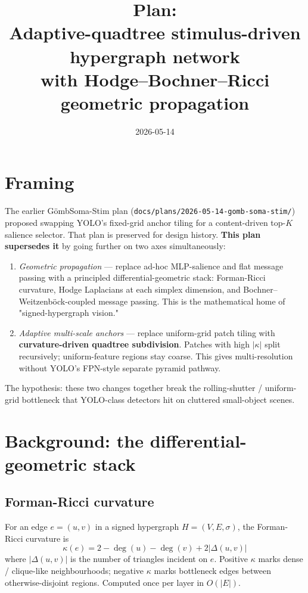 \documentclass[11pt,a4paper]{article}
\title{Plan: \RicciStim{} \\
       \large{Adaptive-quadtree stimulus-driven hypergraph network\\
              with Hodge--Bochner--Ricci geometric propagation}}
\date{2026-05-14}
\author{}
\newcommand{\sig}{\ensuremath{\sigma}}
\newcommand{\Soma}{G\"ombSoma}
\begin{document}
\maketitle

\section{Framing}

The earlier \Soma-Stim plan (\texttt{docs/plans/2026-05-14-gomb-soma-stim/})
proposed swapping YOLO's fixed-grid anchor tiling for a content-driven
top-$K$ salience selector. That plan is preserved for design history.
\textbf{This plan supersedes it} by going further on two axes simultaneously:

\begin{enumerate}
\item \emph{Geometric propagation} --- replace ad-hoc MLP-salience and
  flat message passing with a principled differential-geometric stack:
  Forman-Ricci curvature, Hodge Laplacians at each simplex dimension,
  and Bochner--Weitzenböck-coupled message passing. This is the
  mathematical home of "signed-hypergraph vision."
\item \emph{Adaptive multi-scale anchors} --- replace uniform-grid
  patch tiling with \textbf{curvature-driven quadtree subdivision}.
  Patches with high $|\kappa|$ split recursively; uniform-feature
  regions stay coarse. This gives multi-resolution without YOLO's
  FPN-style separate pyramid pathway.
\end{enumerate}

The hypothesis: these two changes together break the rolling-shutter /
uniform-grid bottleneck that YOLO-class detectors hit on cluttered
small-object scenes.

\section{Background: the differential-geometric stack}

\subsection{Forman-Ricci curvature}

For an edge $e = (u, v)$ in a signed hypergraph $H = (V, E, \sig)$,
the Forman-Ricci curvature is
\[
\kappa(e) = 2 - \deg(u) - \deg(v) + 2 |\Delta(u, v)|
\]
where $|\Delta(u, v)|$ is the number of triangles incident on $e$.
Positive $\kappa$ marks dense / clique-like neighbourhoods;
negative $\kappa$ marks bottleneck edges between otherwise-disjoint
regions. Computed once per layer in $O(|E|)$.
\end{document}

